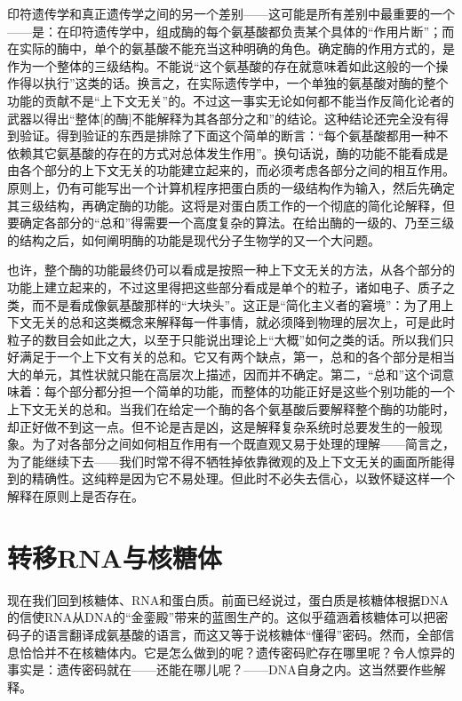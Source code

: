 印符遗传学和真正遗传学之间的另一个差别——这可能是所有差别中最重要的一个——是：在印符遗传学中，组成酶的每个氨基酸都负责某个具体的“作用片断”；而在实际的酶中，单个的氨基酸不能充当这种明确的角色。确定酶的作用方式的，是作为一个整体的三级结构。不能说“这个氨基酸的存在就意味着如此这般的一个操作得以执行”这类的话。换言之，在实际遗传学中，一个单独的氨基酸对酶的整个功能的贡献不是“上下文无关”的。不过这一事实无论如何都不能当作反简化论者的武器以得出“整体[的酶]不能解释为其各部分之和”的结论。这种结论还完全没有得到验证。得到验证的东西是排除了下面这个简单的断言：“每个氨基酸都用一种不依赖其它氨基酸的存在的方式对总体发生作用”。换句话说，酶的功能不能看成是由各个部分的上下文无关的功能建立起来的，而必须考虑各部分之间的相互作用。原则上，仍有可能写出一个计算机程序把蛋白质的一级结构作为输入，然后先确定其三级结构，再确定酶的功能。这将是对蛋白质工作的一个彻底的简化论解释，但要确定各部分的“总和”得需要一个高度复杂的算法。在给出酶的一级的、乃至三级的结构之后，如何阐明酶的功能是现代分子生物学的又一个大问题。

也许，整个酶的功能最终仍可以看成是按照一种上下文无关的方法，从各个部分的功能上建立起来的，不过这里得把这些部分看成是单个的粒子，诸如电子、质子之类，而不是看成像氨基酸那样的“大块头”。这正是“简化主义者的窘境”：为了用上下文无关的总和这类概念来解释每一件事情，就必须降到物理的层次上，可是此时粒子的数目会如此之大，以至于只能说出理论上“大概”如何之类的话。所以我们只好满足于一个上下文有关的总和。它又有两个缺点，第一，总和的各个部分是相当大的单元，其性状就只能在高层次上描述，因而并不确定。第二，“总和”这个词意味着：每个部分都分担一个简单的功能，而整体的功能正好是这些个别功能的一个上下文无关的总和。当我们在给定一个酶的各个氨基酸后要解释整个酶的功能时，却正好做不到这一点。但不论是吉是凶，这是解释复杂系统时总要发生的一般现象。为了对各部分之间如何相互作用有一个既直观又易于处理的理解——简言之，为了能继续下去——我们时常不得不牺牲掉依靠微观的及上下文无关的画面所能得到的精确性。这纯粹是因为它不易处理。但此时不必失去信心，以致怀疑这样一个解释在原则上是否存在。

\section{转移RNA与核糖体}

现在我们回到核糖体、RNA和蛋白质。前面已经说过，蛋白质是核糖体根据DNA的信使RNA从DNA的“金銮殿”带来的蓝图生产的。这似乎蕴涵着核糖体可以把密码子的语言翻译成氨基酸的语言，而这又等于说核糖体“懂得”密码。然而，全部信息恰恰并不在核糖体内。它是怎么做到的呢？遗传密码贮存在哪里呢？令人惊异的事实是：遗传密码就在——还能在哪儿呢？——DNA自身之内。这当然要作些解释。

